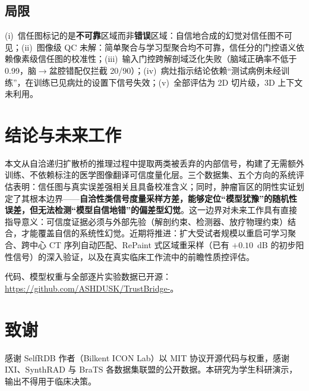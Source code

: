 \documentclass[11pt,a4paper]{ctexart}
\begin{document}
\subsection{局限}
\label{sec:limitation}

(i)~信任图标记的是\textbf{不可靠}区域而非\textbf{错误}区域：自信地合成的幻觉对信任图不可见；(ii)~图像级 QC 未解：简单聚合与学习型聚合均不可靠，信任分的门控语义依赖像素级信任图的校准性；(iii)~输入门控跨解剖域泛化失败（脑域正确率不低于 0.99，脑$\to$盆腔错配仅拦截 20/90）；(iv)~病灶指示结论依赖``测试病例未经训练''，在训练已见病灶的设置下信号失效；(v)~全部评估为 2D 切片级，3D 上下文未利用。

\section{结论与未来工作}

本文从自洽递归扩散桥的推理过程中提取两类被丢弃的内部信号，构建了无需额外训练、不依赖标注的医学图像翻译可信度量化层。三个数据集、五个方向的系统评估表明：信任图与真实误差强相关且具备校准含义；同时，肿瘤盲区的阴性实证划定了其根本边界——\textbf{自洽性类信号度量采样方差，能够定位``模型犹豫''的随机性误差，但无法检测``模型自信地错''的偏差型幻觉}。这一边界对未来工作具有直接指导意义：可信度证据必须与外部先验（解剖约束、检测器、放疗物理约束）结合，才能覆盖自信的系统性幻觉。近期将推进：扩大受试者规模以重启可学习聚合、跨中心 CT 序列自动匹配、RePaint 式区域重采样（已有 $+0.10$~dB 的初步阳性信号）的深入验证，以及在真实临床工作流中的前瞻性质控评估。

代码、模型权重与全部逐片实验数据已开源：\url{https://github.com/ASHDUSK/TrustBridge-}。

\section*{致谢}
感谢 SelfRDB 作者（Bilkent ICON Lab）以 MIT 协议开源代码与权重，感谢 IXI、SynthRAD 与 BraTS 各数据集联盟的公开数据。本研究为学生科研演示，输出不得用于临床决策。
\end{document}
